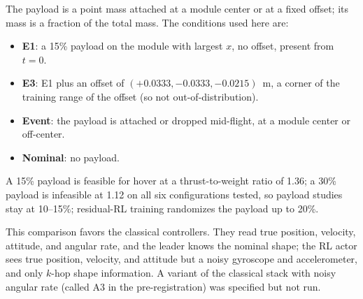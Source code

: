 \documentclass[conference]{IEEEtran}
\begin{document}
The payload is a point mass attached at a module center or at a fixed offset; its mass is a fraction of the total mass. %
The conditions used here are:
\begin{itemize}
\item \textbf{E1}: a 15\% payload on the module with largest $x$, no offset, present from $t=0$. %
\item \textbf{E3}: E1 plus an offset of $(+0.0333,-0.0333,-0.0215)$~m, a corner of the training range of the offset (so not out-of-distribution). %
\item \textbf{Event}: the payload is attached or dropped mid-flight, at a module center or off-center.
\item \textbf{Nominal}: no payload.
\end{itemize}
A 15\% payload is feasible for hover at a thrust-to-weight ratio of 1.36; a 30\% payload is infeasible at 1.12 on all six configurations tested, so payload studies stay at 10--15\%; residual-RL training randomizes the payload up to 20\%. %

This comparison favors the classical controllers.
They read true position, velocity, attitude, and angular rate, and the leader knows the nominal shape; the RL actor sees true position, velocity, and attitude but a noisy gyroscope and accelerometer, and only $k$-hop shape information. %
A variant of the classical stack with noisy angular rate (called A3 in the pre-registration) was specified but not run. %
\end{document}
